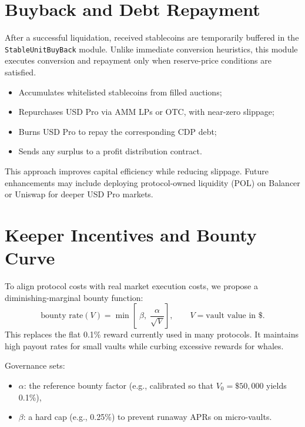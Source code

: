 \documentclass[11pt]{article}
\begin{document}
\section{Buyback and Debt Repayment}
\label{sec:buyback}
After a successful liquidation, received stablecoins are temporarily buffered in the \texttt{StableUnitBuyBack} module.  
Unlike immediate conversion heuristics, this module executes conversion and repayment only when reserve-price conditions are satisfied.

\begin{itemize}
  \item Accumulates whitelisted stablecoins from filled auctions;
  \item Repurchases USD Pro via AMM LPs or OTC, with near-zero slippage;
  \item Burns USD Pro to repay the corresponding CDP debt;
  \item Sends any surplus to a profit distribution contract.
\end{itemize}

This approach improves capital efficiency while reducing slippage.  
Future enhancements may include deploying protocol-owned liquidity (POL) on Balancer or Uniswap for deeper USD Pro markets.

\section{Keeper Incentives and Bounty Curve}
\label{sec:keeper}

To align protocol costs with real market execution costs, we propose a diminishing-marginal bounty function:
\[
\text{bounty rate}(V)=\min\!\left[\;\beta,\;\frac{\alpha}{\sqrt{V}}\right],
\qquad V=\text{vault value in \$}.
\]
This replaces the flat 0.1\% reward currently used in many protocols. It maintains high payout rates for small vaults while curbing excessive rewards for whales.

Governance sets:
\begin{itemize}[noitemsep,topsep=0pt]
  \item \( \alpha \): the reference bounty factor (e.g., calibrated so that \( V_0 = \$50,000 \) yields 0.1\%),
  \item \( \beta \): a hard cap (e.g., 0.25\%) to prevent runaway APRs on micro-vaults.
\end{itemize}
\end{document}
